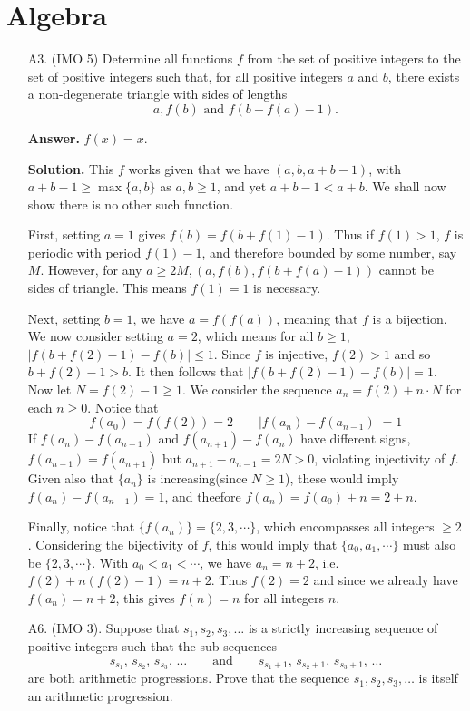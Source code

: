 \documentclass[11pt,a4paper]{article}
\begin{document}
	\section*{Algebra}
	\begin{enumerate}
		\item [A3.] (IMO 5)
		Determine all functions $ f$ from the set of positive integers to the set of positive integers such that, for all positive integers $ a$ and $ b$, there exists a non-degenerate triangle with sides of lengths
		\[ a, f(b) \text{ and } f(b + f(a) - 1).\]
		
		\textbf{Answer.} $f(x) = x$. 
		
		\textbf{Solution.} 
		This $f$ works given that we have $(a, b, a+b-1)$, with $a+b-1\ge \max\{a, b\}$ as $a, b\ge 1$, 
		and yet $a+b-1 < a + b$. 
		We shall now show there is no other such function. 
		
		First, setting $a = 1$ gives $f(b) = f(b + f(1) - 1)$. 
		Thus if $f(1) > 1$, $f$ is periodic with period $f(1) - 1$, and therefore bounded by some number, say $M$. 
		However, for any $a \ge 2M, (a, f(b), f(b+f(a)-1))$ cannot be sides of triangle. 
		This means $f(1)=1$ is necessary. 
		
		Next, setting $b = 1$, we have $a = f(f(a))$, meaning that $f$ is a bijection. 
		We now consider setting $a=2$, which means for all $b\ge 1$, 
		$|f(b + f(2) - 1) - f(b)|\le 1$. 
		Since $f$ is injective, $f(2)>1$ and so $b + f(2)-1 > b$. 
		It then follows that $|f(b + f(2) - 1) - f(b)| = 1$. 
		Now let $N = f(2) - 1\ge 1$. We consider the sequence $a_n = f(2) + n\cdot N$ for each $n\ge 0$. 
		Notice that 
		\[
		f(a_0) = f(f(2)) = 2
		\qquad 
		|f(a_n) - f(a_{n-1})| = 1
		\]
		If $f(a_n) - f(a_{n-1})$ and $f(a_{n+1}) - f(a_{n})$ have different signs, 
		$f(a_{n-1}) = f(a_{n+1})$ but $a_{n+1}-a_{n-1}=2N>0$, 
		violating injectivity of $f$. 
		Given also that $\{a_n\}$ is increasing(since $N\ge 1$), 
		these would imply $f(a_n) - f(a_{n-1}) = 1$, and theefore $f(a_n) = f(a_0) + n = 2 + n$. 
		
		Finally, notice that $\{f(a_n)\}=\{2, 3, \cdots\}$, which encompasses all integers $\ge 2$. 
		Considering the bijectivity of $f$, this would imply that $\{a_0, a_1, \cdots\}$ must also be $\{2, 3, \cdots\}$. 
		With $a_0 < a_1 < \cdots$, we have $a_n = n + 2$, i.e. $f(2) + n(f(2)-1)=n+2$. 
		Thus $f(2)=2$ and since we already have $f(a_n) = n + 2$, this gives $f(n) = n$ for all integers $n$. 
		
		\item [A6.]
		(IMO 3). 
		Suppose that $ s_1,s_2,s_3, \ldots$ is a strictly increasing sequence of positive integers such that the sub-sequences\[s_{s_1},\, s_{s_2},\, s_{s_3},\, \ldots\qquad\text{and}\qquad s_{s_1+1},\, s_{s_2+1},\, s_{s_3+1},\, \ldots\]are both arithmetic progressions. Prove that the sequence $ s_1, s_2, s_3, \ldots$ is itself an arithmetic progression.
		

\end{enumerate}
\end{document}

